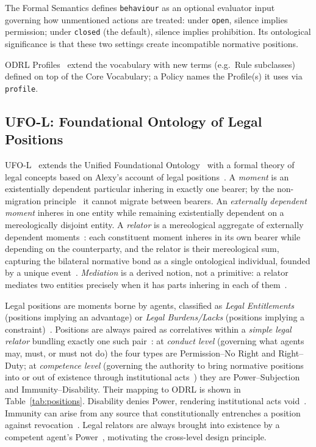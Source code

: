 \documentclass{IOS-Book-Article}
\theoremstyle{definition}
\begin{document}
\noindent The Formal Semantics defines \texttt{behaviour} as an optional
evaluator input~\cite{odrl-formal-semantics} governing how
unmentioned actions are treated: under \texttt{open}, silence
implies permission; under \texttt{closed} (the default), silence implies prohibition. Its ontological significance is that these two settings create incompatible normative positions. 

\noindent ODRL Profiles~\cite{iannella2018odrl} extend the vocabulary with new terms
(e.g.\ Rule subclasses) defined on top of the Core Vocabulary; a Policy
names the Profile(s) it uses via \texttt{profile}.
\subsection{UFO-L: Foundational Ontology of Legal Positions}
\label{sec:ufol}
UFO-L~\cite{griffo2018conceptual,griffo2023powers} extends the Unified
Foundational Ontology~\cite{Guizzardi2022-PORUUF} with a formal theory of
legal concepts based on Alexy's account of legal positions~\cite{alexy2010theory}. A \emph{moment} is an existentially dependent particular inhering in
exactly one bearer; by the non-migration
principle~\cite[a67]{Guizzardi2022-PORUUF} it cannot migrate between bearers. An \emph{externally dependent moment} inheres in one entity
while remaining existentially dependent on a mereologically disjoint entity. A \emph{relator} is a mereological aggregate of externally
dependent moments~\cite{griffo2021service}: each constituent moment inheres in
its own bearer while depending on the counterparty, and the relator is their mereological sum, capturing the bilateral normative bond as a single ontological individual, founded by a unique
event~\cite[a77]{Guizzardi2022-PORUUF}. \emph{Mediation} is a derived notion, not a primitive: a relator
mediates two entities precisely when it has parts inhering in each
of them~\cite[p.~240]{Guizzardi2005ofscm}.
 
\noindent Legal positions are moments borne by agents, classified as
\emph{Legal Entitlements} (positions implying an advantage) or
\emph{Legal Burdens/Lacks} (positions implying a
constraint)~\cite{griffo2021service}. Positions are always paired as
correlatives within a \emph{simple legal relator} bundling exactly one
such pair~\cite{griffo2021service}: at \emph{conduct level} 
(governing what agents may, must, or must not do) the 
four types are Permission--No Right and Right--Duty; 
at \emph{competence level} (governing the authority to 
bring normative positions into or out of existence through 
institutional acts~\cite{alexy2010theory,griffo2021service}) they are Power--Subjection and Immunity--Disability. Their mapping to ODRL is shown in 
Table~\ref{tab:positions}. Disability denies Power, rendering
institutional acts void~\cite{griffo2023powers}. Immunity can arise from any source that constitutionally
entrenches a position against revocation~\cite{griffo2023powers}. Legal relators are always brought into existence by a competent
agent's Power~\cite{griffo2023powers}, motivating the cross-level
design principle.
\end{document}
